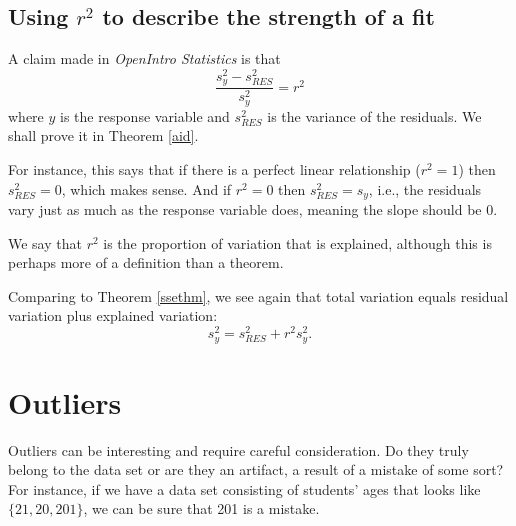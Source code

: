 


\subsection{Using $r^2$ to describe the strength of a fit}


A claim made in \emph{OpenIntro Statistics} is that
\[
	\frac{s_{y}^2 - s_{RES}^2}{s_y^2} = r^2
\]
where $y$ is the response variable and $s_{RES}^2$ is the variance of the residuals. We shall prove it in Theorem \ref{aid}.

For instance, this says that if there is a perfect linear relationship ($r^2=1$) then $s_{RES}^2=0$, which makes sense. And if $r^2=0$ then $s_{RES}^2=s_y$, i.e., the residuals vary just as much as the response variable does, meaning the slope should be 0.

We say that $r^2$ is the proportion of variation that is explained, although this is perhaps more of a definition than a theorem.


Comparing to Theorem \ref{ssethm}, we see again that total variation equals residual variation plus explained variation:
\[
	s_{y}^2 = s_{RES}^2 + r^2s_y^2.
\]



\section{Outliers}
\label{typesOfOutliersInLinearRegression}
 
 Outliers can be interesting and require careful consideration. Do they truly belong to the data set or are they an artifact, a result of a mistake of some sort? For instance, if we have a data set consisting of students' ages that looks like $\{21,20,201\}$, we can be sure that 201 is a mistake.
 
